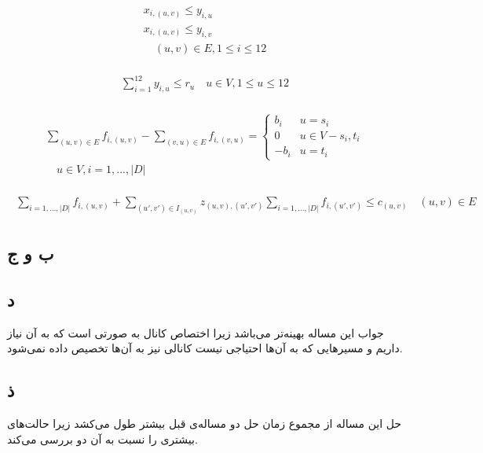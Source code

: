 \documentclass[paper=a4, fontsize=11pt]{article}
\numberwithin{equation}{section} %
\numberwithin{figure}{section} %
\numberwithin{table}{section} %
\begin{document}
\begin{align}
\begin{split}
	x_{i,(u,v)} \le y_{i,u}\\
	x_{i,(u,v)} \le y_{i,v}\\
	\quad (u,v) \in E, 1 \le i \le 12
\end{split}
\end{align}

\begin{align}
\begin{split}
	\sum_{i=1}^{12} y_{i,u} \le r_u
	\quad u \in V, 1 \le u \le 12
\end{split}
\end{align}

\begin{align}
\begin{split}
	\sum_{(u,v) \in E} f_{i,(u,v)} - \sum_{(v,u) \in E} f_{i,(v,u)} = 
	\left \{
		\begin{array}{cc}
			b_i & u = s_i\\
			0 & u \in V - {s_i, t_i}\\
			-b_i & u = t_i
		\end{array}
	\right.
	\\
	\quad u \in V, i = {1, ..., |D|}
\end{split}
\end{align}

\begin{align}
\begin{split}
	\sum_{i = {1, ..., |D|}} f_{i,(u,v)} + \sum_{(u',v') \in I_{(u,v)}} z_{(u,v),(u',v')} \sum_{i = {1, ..., |D|}} f_{i,(u',v')} \le c_{(u,v)}
	\quad (u,v) \in E
\end{split}
\end{align}



\subsection{ب و ج}

\subsection{د}
جواب این مساله بهینه‌تر می‌باشد زیرا اختصاص کانال به صورتی است که به آن نیاز داریم و
مسیرهایی که به آن‌ها احتیاجی نیست کانالی نیز به آن‌ها تخصیص داده نمی‌شود.

\subsection{ذ}
حل این مساله از مجموع زمان حل دو مساله‌ی قبل بیشتر طول می‌کشد زیرا حالت‌های بیشتری را نسبت به آن دو بررسی می‌کند.
\end{document}
